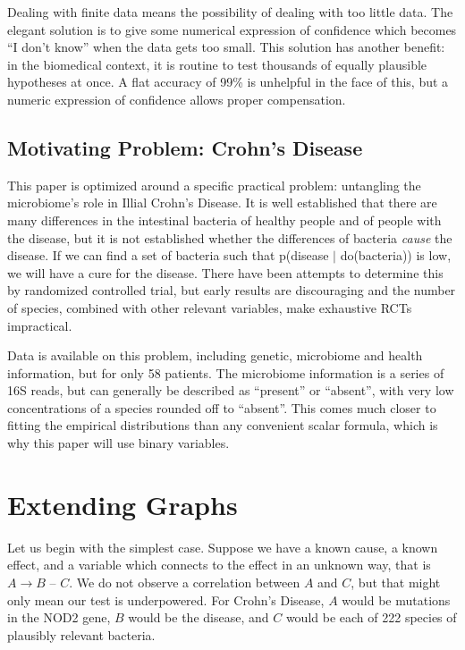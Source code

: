 \documentclass[twocolumn,12pt]{article}
\begin{document}
Dealing with finite data means the possibility of dealing with too
little data.  The elegant solution is to give some numerical
expression of confidence which becomes ``I don't know'' when the data
gets too small.  This solution has another benefit: in the biomedical
context, it is routine to test thousands of equally plausible
hypotheses at once.  A flat accuracy of 99\% is unhelpful in the face
of this, but a numeric expression of confidence allows proper
compensation.

\subsection{Motivating Problem: Crohn's Disease}

This paper is optimized around a specific practical problem:
untangling the microbiome's role in Illial Crohn's Disease.  It is
well established that there are many differences in the intestinal
bacteria of healthy people and of people with the disease\cite{hofer}, but it is
not established whether the differences of bacteria \textit{cause} the
disease.  If we can find a set of bacteria such that
p(disease $|$ do(bacteria)) is low, we will have a cure for the disease.
There have been attempts to determine this by randomized controlled
trial, but early results are discouraging\cite{rctma} and the number
of species, combined with other relevant
variables, make exhaustive RCTs impractical.

Data is available on this problem\cite{data}, including genetic, microbiome and
health information, but for only 58 patients.  The microbiome
information is a series of 16S reads, but can generally be described
as ``present'' or ``absent'', with very low concentrations of a
species rounded off to ``absent''.  This comes much closer to fitting
the empirical distributions than any convenient scalar formula, which
is why this paper will use binary variables.

\section{Extending Graphs}

Let us begin with the simplest case.  Suppose we have a known cause, a
known effect, and a variable which connects to the effect in an
unknown way, that is $A \rightarrow B$ -- $C$.  We do not observe a
correlation between $A$ and $C$, but that might only mean our test is
underpowered.  For Crohn's Disease, $A$ would be mutations in the NOD2
gene\cite{nod2}, $B$ would be the disease, and $C$ would be each of 222
species of plausibly relevant bacteria.
\end{document}
